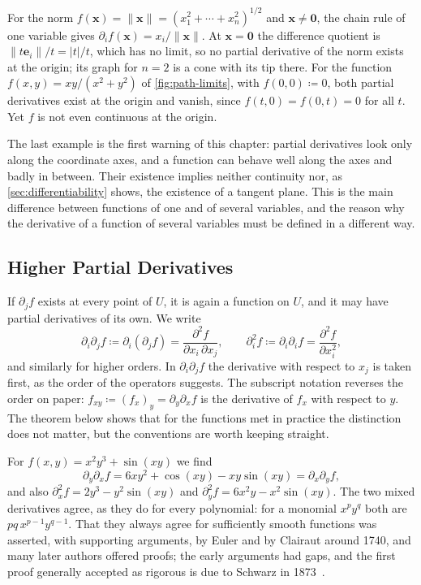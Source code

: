 For the norm $f(\mathbf x)=\|\mathbf x\|=(x_1^2+\cdots+x_n^2)^{1/2}$ and $\mathbf x\ne\mathbf 0$, the chain rule of one variable gives $\partial_if(\mathbf x)=x_i/\|\mathbf x\|$. At $\mathbf x=\mathbf 0$ the difference quotient is $\|t\mathbf e_i\|/t=|t|/t$, which has no limit, so no partial derivative of the norm exists at the origin; its graph for $n=2$ is a cone with its tip there. For the function $f(x,y)=xy/(x^2+y^2)$ of \cref{fig:path-limits}, with $f(0,0)\coloneqq0$, both partial derivatives exist at the origin and vanish, since $f(t,0)=f(0,t)=0$ for all $t$. Yet $f$ is not even continuous at the origin.

The last example is the first warning of this chapter: partial derivatives look only along the coordinate axes, and a function can behave well along the axes and badly in between. Their existence implies neither continuity nor, as \cref{sec:differentiability} shows, the existence of a tangent plane. This is the main difference between functions of one and of several variables, and the reason why the derivative of a function of several variables must be defined in a different way.

\subsection{Higher Partial Derivatives}

If $\partial_jf$ exists at every point of $U$, it is again a function on $U$, and it may have partial derivatives of its own. We write
\[
\partial_i\partial_jf\coloneqq\partial_i(\partial_jf)=\frac{\partial^2f}{\partial x_i\,\partial x_j},\qquad\partial_i^2f\coloneqq\partial_i\partial_if=\frac{\partial^2f}{\partial x_i^2},
\]
and similarly for higher orders. In $\partial_i\partial_jf$ the derivative with respect to $x_j$ is taken first, as the order of the operators suggests. The subscript notation reverses the order on paper: $f_{xy}\coloneqq(f_x)_y=\partial_y\partial_xf$ is the derivative of $f_x$ with respect to $y$. The theorem below shows that for the functions met in practice the distinction does not matter, but the conventions are worth keeping straight.

For $f(x,y)=x^2y^3+\sin(xy)$ we find
\[
\partial_y\partial_xf=6xy^2+\cos(xy)-xy\sin(xy)=\partial_x\partial_yf,
\]
and also $\partial_x^2f=2y^3-y^2\sin(xy)$ and $\partial_y^2f=6x^2y-x^2\sin(xy)$. The two mixed derivatives agree, as they do for every polynomial: for a monomial $x^py^q$ both are $pq\,x^{p-1}y^{q-1}$. That they always agree for sufficiently smooth functions was asserted, with supporting arguments, by Euler and by Clairaut around 1740, and many later authors offered proofs; the early arguments had gaps, and the first proof generally accepted as rigorous is due to Schwarz in 1873~\cite{schwarz1873}\cite[pp.~317--318]{hairer1996analysis}.

